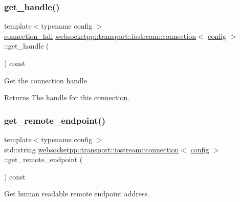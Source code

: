 \subsubsection{\texorpdfstring{get\+\_\+handle()}{get\_handle()}}
{\footnotesize\ttfamily template$<$typename config $>$ \\
\mbox{\hyperlink{namespacewebsocketpp_a6b3d26a10ee7229b84b776786332631d}{connection\+\_\+hdl}} \mbox{\hyperlink{classwebsocketpp_1_1transport_1_1iostream_1_1connection}{websocketpp\+::transport\+::iostream\+::connection}}$<$ \mbox{\hyperlink{classconfig}{config}} $>$\+::get\+\_\+handle (\begin{DoxyParamCaption}{ }\end{DoxyParamCaption}) const\hspace{0.3cm}{\ttfamily [inline]}}



Get the connection handle. 

\begin{DoxyReturn}{Returns}
The handle for this connection. 
\end{DoxyReturn}
\mbox{\label{classwebsocketpp_1_1transport_1_1iostream_1_1connection_ac1c63528e36a2a60c0efc01a1c17584e}} 
\subsubsection{\texorpdfstring{get\+\_\+remote\+\_\+endpoint()}{get\_remote\_endpoint()}}
{\footnotesize\ttfamily template$<$typename config $>$ \\
std\+::string \mbox{\hyperlink{classwebsocketpp_1_1transport_1_1iostream_1_1connection}{websocketpp\+::transport\+::iostream\+::connection}}$<$ \mbox{\hyperlink{classconfig}{config}} $>$\+::get\+\_\+remote\+\_\+endpoint (\begin{DoxyParamCaption}{ }\end{DoxyParamCaption}) const\hspace{0.3cm}{\ttfamily [inline]}}



Get human readable remote endpoint address. 

